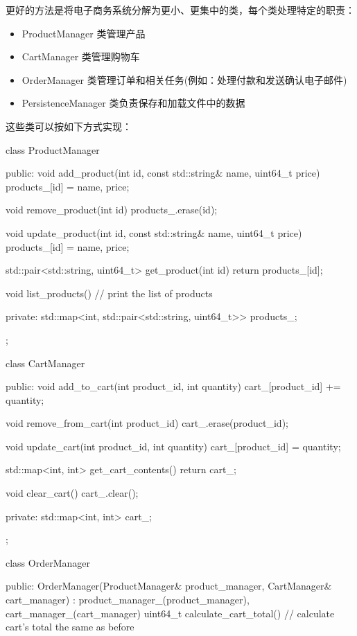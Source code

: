 更好的方法是将电子商务系统分解为更小、更集中的类，每个类处理特定的职责：

\begin{itemize}
\item
ProductManager 类管理产品

\item
CartManager 类管理购物车

\item
OrderManager 类管理订单和相关任务(例如：处理付款和发送确认电子邮件)

\item
PersistenceManager 类负责保存和加载文件中的数据
\end{itemize}

这些类可以按如下方式实现：

\begin{cpp}
class ProductManager {
public:
    void add_product(int id, const std::string& name, uint64_t price)
    {
        products_[id] = {name, price};
    }

    void remove_product(int id) {
        products_.erase(id);
    }

    void update_product(int id, const std::string& name, uint64_t price) {
        products_[id] = {name, price};
    }

    std::pair<std::string, uint64_t> get_product(int id) {
        return products_[id];
    }

    void list_products() {
        // print the list of products
    }

private:
    std::map<int, std::pair<std::string, uint64_t>> products_;
};

class CartManager {
public:
    void add_to_cart(int product_id, int quantity) {
        cart_[product_id] += quantity;
    }

    void remove_from_cart(int product_id) {
        cart_.erase(product_id);
    }

    void update_cart(int product_id, int quantity) {
        cart_[product_id] = quantity;
    }

    std::map<int, int> get_cart_contents() {
        return cart_;
    }

    void clear_cart() {
        cart_.clear();
    }

private:
    std::map<int, int> cart_;
};

class OrderManager {
public:
    OrderManager(ProductManager& product_manager, CartManager& cart_manager)
    : product_manager_(product_manager), cart_manager_(cart_manager) {}
        uint64_t calculate_cart_total() {
        // calculate cart's total the same as before
    }

}
\end{cpp}
